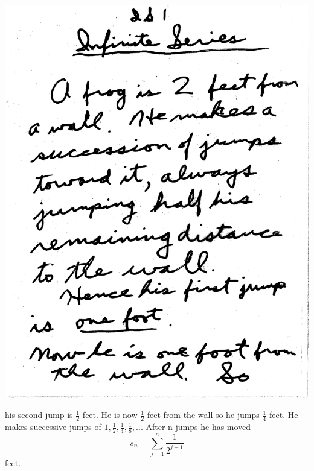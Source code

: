 \documentclass[10pt,a4paper]{article}
\begin{document}
{{\includegraphics[scale=.5]{Pages/IS_1}

\newpage

his second jump is ${\frac{1}{2}}$ feet. He is now ${\frac{1}{2}}$ feet from the wall so he jumps ${\frac{1}{4}}$ feet. He makes successive jumps of ${1, \frac{1}{2}, \frac{1}{4}, \frac{1}{8}, . . .}$ After n jumps he has moved $$s_{n}=\sum_{j=1}^{n} {\frac{1}{2^{j-1}}}$$ feet. 

}}
\end{document}

